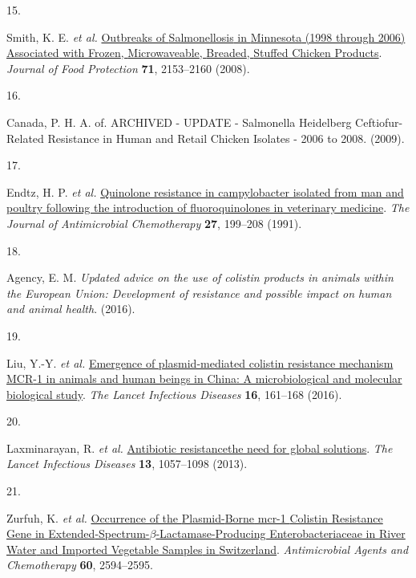 \documentclass[
]{book}
\newlength{\cslhangindent}
\newlength{\csllabelwidth}
\newlength{\cslentryspacingunit} %
\newenvironment{CSLReferences}[2] %
 {%
  \setlength{\parindent}{0pt}
  \ifodd #1
  \let\oldpar\par
  \def\par{\hangindent=\cslhangindent\oldpar}
  \fi
  \setlength{\parskip}{#2\cslentryspacingunit}
 }%
 {}
\newcommand{\CSLLeftMargin}[1]{\parbox[t]{\csllabelwidth}{#1}}
\newcommand{\CSLRightInline}[1]{\parbox[t]{\linewidth - \csllabelwidth}{#1}\break}
\begin{document}
\begin{CSLReferences}{0}{0}
\leavevmode{}%
\CSLLeftMargin{15. }
\CSLRightInline{Smith, K. E. \emph{et al.} \href{https://doi.org/10.4315/0362-028X-71.10.2153}{Outbreaks of {Salmonellosis} in {Minnesota} (1998 through 2006) {Associated} with {Frozen}, {Microwaveable}, {Breaded}, {Stuffed Chicken Products}}. \emph{Journal of Food Protection} \textbf{71}, 2153--2160 (2008).}

\leavevmode{}%
\CSLLeftMargin{16. }
\CSLRightInline{Canada, P. H. A. of. {ARCHIVED} - {UPDATE} - {Salmonella Heidelberg Ceftiofur}-{Related Resistance} in {Human} and {Retail Chicken Isolates} - 2006 to 2008. (2009).}

\leavevmode{}%
\CSLLeftMargin{17. }
\CSLRightInline{Endtz, H. P. \emph{et al.} \href{https://doi.org/10.1093/jac/27.2.199}{Quinolone resistance in campylobacter isolated from man and poultry following the introduction of fluoroquinolones in veterinary medicine}. \emph{The Journal of Antimicrobial Chemotherapy} \textbf{27}, 199--208 (1991).}

\leavevmode{}%
\CSLLeftMargin{18. }
\CSLRightInline{Agency, E. M. \emph{Updated advice on the use of colistin products in animals within the {European Union}: Development of resistance and possible impact on human and animal health}. (2016).}

\leavevmode{}%
\CSLLeftMargin{19. }
\CSLRightInline{Liu, Y.-Y. \emph{et al.} \href{https://doi.org/10.1016/S1473-3099(15)00424-7}{Emergence of plasmid-mediated colistin resistance mechanism {MCR}-1 in animals and human beings in {China}: A microbiological and molecular biological study}. \emph{The Lancet Infectious Diseases} \textbf{16}, 161--168 (2016).}

\leavevmode{}%
\CSLLeftMargin{20. }
\CSLRightInline{Laxminarayan, R. \emph{et al.} \href{https://doi.org/10.1016/S1473-3099(13)70318-9}{Antibiotic resistance\textemdash the need for global solutions}. \emph{The Lancet Infectious Diseases} \textbf{13}, 1057--1098 (2013).}

\leavevmode{}%
\CSLLeftMargin{21. }
\CSLRightInline{Zurfuh, K. \emph{et al.} \href{https://doi.org/10.1128/AAC.00066-16}{Occurrence of the {Plasmid}-{Borne} mcr-1 {Colistin Resistance Gene} in {Extended}-{Spectrum}-{\(\beta\)}-{Lactamase}-{Producing Enterobacteriaceae} in {River Water} and {Imported Vegetable Samples} in {Switzerland}}. \emph{Antimicrobial Agents and Chemotherapy} \textbf{60}, 2594--2595.}


\end{CSLReferences}
\end{document}
